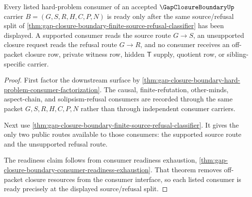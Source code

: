 \begin{theorem}
\label{thm:gap-closure-boundary-consumer-source-refusal-readiness}
Every listed hard-problem consumer of an accepted $\GapClosureBoundaryUp$ carrier $B=(G,S,R,H,C,P,N)$ is ready only after the same source/refusal split of \autoref{thm:gap-closure-boundary-finite-source-refusal-classifier} has been displayed. A supported consumer reads the source route $G \longrightarrow S$, an unsupported closure request reads the refusal route $G \longrightarrow R$, and no consumer receives an off-packet closure row, private witness row, hidden $\mathsf{T}$ supply, quotient row, or sibling-specific carrier.
\end{theorem}
\begin{proof}
First factor the downstream surface by \autoref{thm:gap-closure-boundary-hard-problem-consumer-factorization}. The causal, finite-refutation, other-minds, aspect-chain, and solipsism-refusal consumers are recorded through the same packet $G,S,R,H,C,P,N$ rather than through independent consumer carriers.

Next use \autoref{thm:gap-closure-boundary-finite-source-refusal-classifier}. It gives the only two public routes available to those consumers: the supported source route and the unsupported refusal route.

The readiness claim follows from consumer readiness exhaustion, \autoref{thm:gap-closure-boundary-consumer-readiness-exhaustion}. That theorem removes off-packet closure resources from the consumer interface, so each listed consumer is ready precisely at the displayed source/refusal split.
\end{proof}

